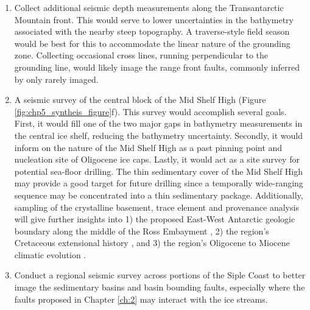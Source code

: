 \begin{enumerate}
    \item Collect additional seismic depth measurements along the Transantarctic Mountain front. This would serve to lower uncertainties in the bathymetry associated with the nearby steep topography. A traverse-style field season would be best for this to accommodate the linear nature of the grounding zone. Collecting occasional cross lines, running perpendicular to the grounding line, would likely image the range front faults, commonly inferred by only rarely imaged. 
    \item A seismic survey of the central block of the Mid Shelf High (Figure \ref{fig:chp5_syntheis_figure}f). This survey would accomplish several goals. First, it would fill one of the two major gaps in bathymetry measurements in the central ice shelf, reducing the bathymetry uncertainty. Secondly, it would inform on the nature of the Mid Shelf High as a past pinning point and nucleation site of Oligocene ice caps. Lastly, it would act as a site survey for potential sea-floor drilling. The thin sedimentary cover of the Mid Shelf High may provide a good target for future drilling since a temporally wide-ranging sequence may be concentrated into a thin sedimentary package. Additionally, sampling of the crystalline basement, trace element and provenance analysis will give further insights into 1) the proposed East-West Antarctic geologic boundary along the middle of the Ross Embayment \citep{tintoross2019}, 2) the region's Cretaceous extensional history \citep{olivettiice2023}, and 3) the region's Oligocene to Miocene climatic evolution \citep{olivettiice2023}.
    \item Conduct a regional seismic survey across portions of the Siple Coast to better image the sedimentary basins and basin bounding faults, especially where the faults proposed in Chapter \ref{ch:2} may interact with the ice streams.
\end{enumerate}

